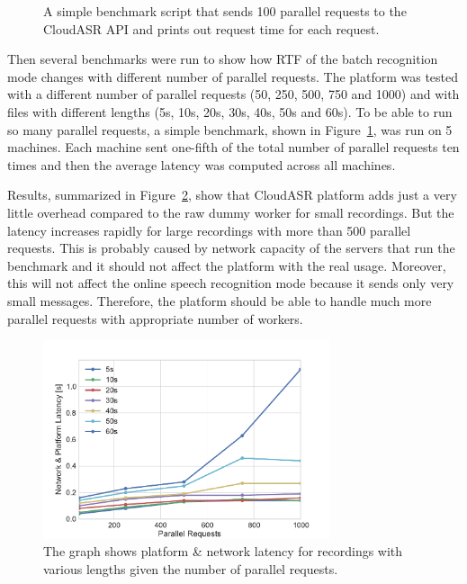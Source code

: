 \begin{figure}[h]
  

  \caption{A simple benchmark script that sends 100 parallel requests to the CloudASR API and prints out request time for each request.}
  \label{fig:benchmark}
\end{figure}

Then several benchmarks were run to show how RTF of the batch recognition mode changes with different number of parallel requests.
The platform was tested with a different number of parallel requests (50, 250, 500, 750 and 1000)
  and with files with different lengths (5s, 10s, 20s, 30s, 40s, 50s and 60s).
To be able to run so many parallel requests,
  a simple benchmark, shown in Figure~\ref{fig:benchmark}, was run on 5 machines.
Each machine sent one-fifth of the total number of parallel requests ten times
  and then the average latency was computed across all machines.

Results, summarized in Figure~\ref{fig:parallel-benchmark}, show
  that CloudASR platform adds just a very little overhead compared to the raw dummy worker for small recordings.
But the latency increases rapidly for large recordings with more than 500 parallel requests.
This is probably caused by network capacity of the servers that run the benchmark
  and it should not affect the platform with the real usage.
Moreover, this will not affect the online speech recognition mode because it sends only very small messages.
Therefore, the platform should be able to handle much more parallel requests with appropriate number of workers.

\begin{figure}
  \centering
  \includegraphics[width=0.75\textwidth]{./img/parallel.pdf}

  \caption{
    The graph shows platform \& network latency for recordings with various lengths
      given the number of parallel requests.
  }
  \label{fig:parallel-benchmark}
\end{figure}
